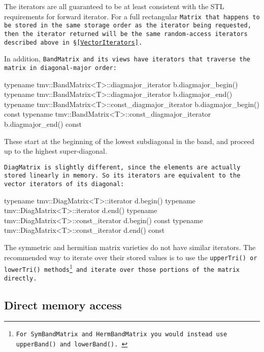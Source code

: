 The iterators are all guaranteed
to be at least consistent with the STL requirements for forward iterator.
For a full rectangular \tt{Matrix} that happens to be stored in the same storage order as the iterator being requested, then the iterator returned will be the same random-access iterators described above in \S\ref{VectorIterators}.

In addition, \tt{BandMatrix} and its views have iterators that traverse the matrix in diagonal-major order:
\begin{tmvcode}
typename tmv::BandMatrix<T>::diagmajor_iterator b.diagmajor_begin()
typename tmv::BandMatrix<T>::diagmajor_iterator b.diagmajor_end()
typename tmv::BandMatrix<T>::const_diagmajor_iterator 
        b.diagmajor_begin() const
typename tmv::BandMatrix<T>::const_diagmajor_iterator 
        b.diagmajor_end() const
\end{tmvcode}
These start at the beginning of the lowest subdiagonal in the band, and proceed up to the highest super-diagonal.

\tt{DiagMatrix} is slightly different, since the elements are actually stored linearly in memory.  So its iterators are equivalent to the vector iterators of its diagonal:
\begin{tmvcode}
typename tmv::DiagMatrix<T>::iterator d.begin()
typename tmv::DiagMatrix<T>::iterator d.end()
typename tmv::DiagMatrix<T>::const_iterator d.begin() const
typename tmv::DiagMatrix<T>::const_iterator d.end() const
\end{tmvcode}

The symmetric and hermitian matrix varieties do not have similar iterators.  The recommended way to iterate over their stored values is to use the \tt{upperTri()} or \tt{lowerTri()} methods\footnote{
For \tt{SymBandMatrix} and \tt{HermBandMatrix} you would instead use \tt{upperBand()} and 
\tt{lowerBand()}.
} and iterate over those portions of the matrix directly.

\subsection{Direct memory access}
\label{DirectAccess}

